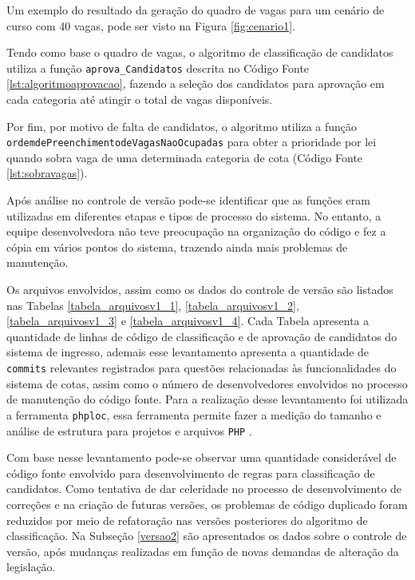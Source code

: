 Um exemplo do resultado da geração do quadro de vagas para um cenário de curso com 40 vagas,  pode ser visto na Figura \ref{fig:cenario1}.



\newpage
Tendo como base o quadro de vagas, o algoritmo de classificação de candidatos utiliza a função \texttt{aprova\_Candidatos} descrita no Código Fonte \ref{lst:algoritmoaprovacao}, fazendo a seleção dos candidatos para aprovação em cada categoria até atingir o total de vagas disponíveis. 
\newpage


Por fim, por motivo de falta de candidatos, o algoritmo utiliza a função \texttt{ordemdePreenchime}\newline\texttt{ntodeVagasNaoOcupadas} para obter a prioridade por lei quando sobra vaga de uma determinada categoria de cota (Código Fonte \ref{lst:sobravagas}).

\newpage


Após análise no controle de versão pode-se identificar que as funções eram utilizadas em diferentes etapas e tipos de processo do sistema. No entanto, a equipe desenvolvedora não teve preocupação na organização do código e fez a cópia em vários pontos do sistema, trazendo ainda mais problemas de manutenção. 

Os arquivos envolvidos, assim como os dados do controle de versão são listados nas Tabelas \ref{tabela_arquivosv1_1}, \ref{tabela_arquivosv1_2}, \ref{tabela_arquivosv1_3} e \ref{tabela_arquivosv1_4}. Cada Tabela apresenta a quantidade de linhas de código de classificação e de aprovação de candidatos do sistema de ingresso, ademais esse levantamento apresenta a quantidade de \texttt{commits} relevantes registrados para questões relacionadas às funcionalidades do sistema de cotas, assim como o número de desenvolvedores envolvidos no processo de manutenção do código fonte. Para a realização desse levantamento foi utilizada a ferramenta \texttt{phploc}, essa ferramenta permite fazer a medição do tamanho e análise de estrutura para projetos e arquivos \texttt{PHP} \cite{phplock}.



\newpage
Com base nesse levantamento pode-se observar uma quantidade considerável de código fonte envolvido para desenvolvimento de regras para classificação de candidatos. Como tentativa de dar celeridade no processo de desenvolvimento de correções e na criação de futuras versões, os problemas de código duplicado foram reduzidos por meio de refatoração nas versões posteriores do algoritmo de classificação. Na Subseção \ref{versao2} são apresentados os dados sobre o controle de versão, após mudanças realizadas em função de novas demandas de alteração da legislação.
